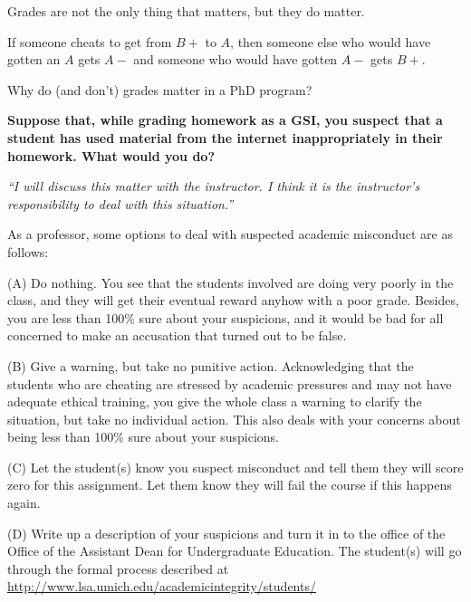 \documentclass[portrait,11pt]{seminar}
\begin{document}
\es
\bs

Grades are not the only thing that matters, but they do matter.

If someone cheats to get from $B+$ to $A$, then someone else who would have gotten an $A$ gets $A-$ and someone who would have gotten $A-$ gets $B+$.

\medskip

Why do (and don't) grades matter in a PhD program?

\es

\bs

{\bf 
Suppose that, while grading homework as a GSI, you suspect that a student has used material from the internet inappropriately in their homework. What would you do?
}


{\it ``I will discuss this matter with the instructor. I think it is the instructor’s responsibility to deal with this situation.''}

\es
\bs

As a professor, some options to deal with suspected academic misconduct are as follows:

(A) Do nothing. You see that the students involved are doing very poorly in the class, and they will get their eventual reward anyhow with a poor grade. Besides, you are less than 100\% sure about your suspicions, and it would be bad for all concerned to make an accusation that turned out to be false.

(B) Give a warning, but take no punitive action. Acknowledging that the students who are cheating are stressed by academic pressures and may not have adequate ethical training, you give the whole class a warning to clarify the situation, but take no individual action. This also deals with your concerns about being less than  100\% sure about your suspicions.

\es
\bs

(C) Let the student(s) know you suspect misconduct and tell them they will score zero for this assignment. Let them know they will fail the course if this happens again.

(D) Write up a description of your suspicions and turn it in to the office of the Office of the Assistant Dean for Undergraduate Education. The student(s) will go through the formal process described at
\url{http://www.lsa.umich.edu/academicintegrity/students/}

\es
\end{document}

